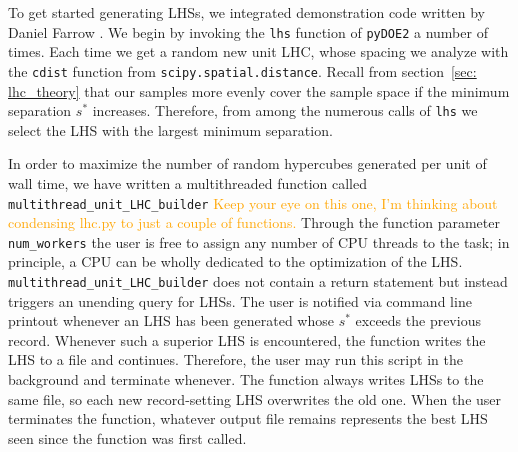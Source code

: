 To get started generating LHSs, we integrated demonstration code written by 
Daniel Farrow . We begin by invoking the \verb|lhs| function of
\verb|pyDOE2| a number of times. Each time we get a random new unit LHC, whose
spacing we analyze with the \verb|cdist| function from
\verb|scipy.spatial.distance|.  Recall from section~\ref{sec: lhc_theory} that
our samples more evenly cover the sample space if the minimum separation
$s^*$ increases. Therefore, from among the numerous calls of \verb|lhs| we 
select the LHS with the largest minimum separation.

In order to maximize the number of random hypercubes generated per unit of
wall time, we have written a multithreaded function called
\verb|multithread_unit_LHC_builder| \textcolor{orange}{Keep your eye on this
one, I'm thinking about condensing lhc.py to just a couple of functions.}
Through the function parameter \verb|num_workers| the user is free to assign
any number of CPU threads to the task; in principle, a CPU can be
wholly dedicated to the optimization of the LHS.
\verb|multithread_unit_LHC_builder| does not contain a return statement but
instead triggers an unending query for LHSs. The user is notified via command
line printout whenever an LHS has been generated whose $s^*$ exceeds
the previous record. Whenever such a superior LHS is
encountered, the function writes the LHS to a file and continues. Therefore,
the user may run this script in the background and terminate whenever. The
function always writes LHSs to the same file, so each new record-setting LHS
overwrites the old one. When the user terminates the function, whatever output
file remains represents the best LHS seen since the function was first called.

\begin{comment}
The \verb|cdist| function can be re-used to compare LHSs loaded from 
different
files. However, since there is generally little reason to keep old LHSs
(except, perhaps, to reconstruct specific emulators), it reduces clutter to
simply continue overwriting the same file. Therefore, the function
\verb|multithread_unit_LHC_builder| also includes a parameter
\verb|previous_record|, which is recommended whenever the user would like to
stop the function and then resume it later. In such a case, the parameter
should be set to the \verb|cdist| value of the exis}
\end{comment}

